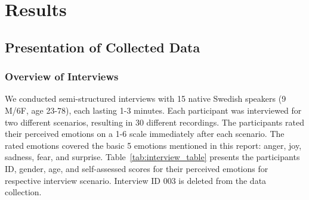 \chapter{Results}
\label{sec:results}

\section{Presentation of Collected Data}
\subsection{Overview of Interviews}
We conducted semi-structured interviews with 15 native Swedish speakers (9 M/6F, age 23-78), each lasting 1-3 minutes. Each participant was interviewed for two different scenarios, resulting in 30 different recordings. The participants rated their perceived emotions on a 1-6 scale immediately after each scenario. The rated emotions covered the basic 5 emotions mentioned in this report: anger, joy, sadness, fear, and surprise. 
Table~\ref{tab:interview_table} presents the participants ID, gender, age, and self-assessed scores for their perceived emotions for respective interview scenario. Interview ID 003 is deleted from the data collection. 
